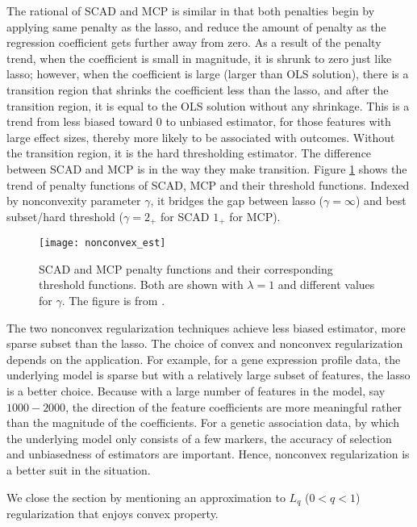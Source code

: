 The rational of SCAD and MCP is similar in that both penalties begin by applying same penalty as the lasso, and reduce the amount of penalty as the regression coefficient gets further away from zero. As a result of the penalty trend, when the coefficient is small in magnitude, it is shrunk to zero just like lasso; however, when the coefficient is large (larger than OLS solution), there is a transition region that shrinks the coefficient less than the lasso, and after the transition region, it is equal to the OLS solution without any shrinkage. This is a trend from less biased toward 0 to unbiased estimator, for those features with large effect sizes, thereby more likely to be associated with outcomes. Without the transition region, it is the hard thresholding estimator. The difference between SCAD and MCP is in the way they make transition. Figure \ref{fig:nonconvex_est} shows the trend of penalty functions of SCAD, MCP and their threshold functions. Indexed by nonconvexity parameter $\gamma$, it bridges the gap between lasso ($\gamma=\infty$) and best subset/hard threshold ($\gamma=2_+$ for SCAD $1_+$ for MCP).   
\begin{figure}[tbh]
  \centering
  \texttt{[image: nonconvex\_est]}
  \caption[SCAD and MCP penalty functions and their corresponding threshold functions] {
    SCAD and MCP penalty functions and their corresponding threshold functions. Both are shown with $\lambda=1$ and different values for $\gamma$. The figure is from \cite{mazumder2011sparsenet}. 
  }
  \label{fig:nonconvex_est}
\end{figure}

The two nonconvex regularization techniques achieve less biased estimator, more sparse subset than the lasso. The choice of convex and nonconvex regularization depends on the application. For example, for a gene expression profile data, the underlying model is sparse but with a relatively large subset of features, the lasso is a better choice. Because with a large number of features in the model, say $1000-2000$, the direction of the feature coefficients are more meaningful rather than the magnitude of the coefficients. For a genetic association data, by which the underlying model only consists of a few markers, the accuracy of selection and unbiasedness of estimators are important. Hence, nonconvex regularization is a better suit in the situation.

We close the section by mentioning an approximation to $L_q$ ($0<q<1$) regularization that enjoys convex property.

